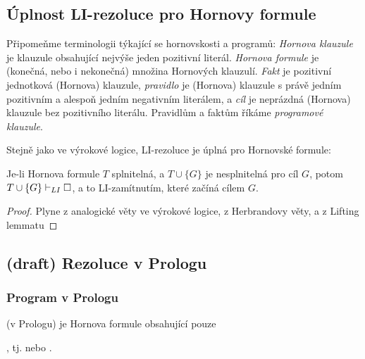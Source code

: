 \subsection{Úplnost LI-rezoluce pro Hornovy formule}

Připomeňme terminologii týkající se hornovskosti a programů: \emph{Hornova klauzule} je klauzule obsahující nejvýše jeden pozitivní literál. \emph{Hornova formule} je (konečná, nebo i nekonečná) množina Hornových klauzulí.
\emph{Fakt} je pozitivní jednotková (Hornova) klauzule, \emph{pravidlo} je (Hornova) klauzule s právě jedním pozitivním a alespoň jedním negativním literálem, a \emph{cíl} je neprázdná (Hornova) klauzule bez pozitivního literálu. Pravidlům a faktům říkáme \emph{programové klauzule}.

Stejně jako ve výrokové logice, LI-rezoluce je úplná pro Hornovské formule:

\begin{theorem}\label{theorem:completeness-of-li-resolution-for-horn-predicate}
Je-li Hornova formule $T$ splnitelná, a $T\cup\{G\}$ je nesplnitelná pro cíl $G$, potom $T\cup\{G\}\vdash_{LI}\square$, a to LI-zamítnutím, které začíná cílem $G$.   
\end{theorem}
\begin{proof}
    Plyne z analogické věty ve výrokové logice, z Herbrandovy věty, a z Lifting lemmatu
\end{proof}


\subsection{(draft) Rezoluce v Prologu}\todo

\subsubsection*{Program v Prologu}
     (v Prologu) je Hornova formule obsahující pouze 
    \smallskip
    
    , tj.  nebo .
    \bigskip
    
